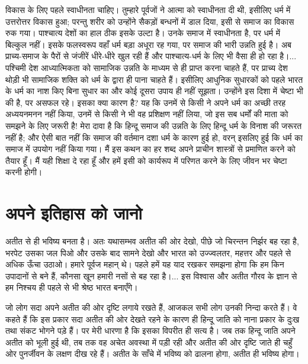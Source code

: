 विकास के लिए पहले स्वाधीनता चाहिए। तुम्हारे पूर्वजों ने आत्मा को स्वाधीनता दी थी, इसीलिए धर्म में उत्तरोत्तर विकास हुआ; परन्तु शरीर को उन्होंने सैकड़ों बन्धनों में डाल दिया, इसी से समाज का विकास रुक गया। पाश्चात्य देशों का हाल ठीक इसके उल्टा है। उनके समाज में स्वाधीनता है, पर धर्म में बिल्कुल नहीं। इसके फलस्वरूप वहाँ धर्म बड़ा अधूरा रह गया, पर समाज की भारी उन्नति हुई है। अब प्राच्य-समाज के पैरों से जंजीरें धीरे-धीरे खुल रही हैं और पाश्चात्य-धर्म के लिए भी वैसा ही हो रहा है।... पश्चिमी देश आध्यात्मिकता को सामाजिक उन्नति के माध्यम से ही प्राप्त करना चाहते हैं, पर प्राच्य देश थोड़ी भी सामाजिक शक्ति को धर्म के द्वारा ही पाना चाहते हैं। इसीलिए आधुनिक सुधारकों को पहले भारत के धर्म का नाश किए बिना सुधार का और कोई दूसरा उपाय ही नहीं सूझता। उन्होंने इस दिशा में चेष्टा भी की है, पर असफल रहे। इसका क्या कारण है? यह कि उनमें से किसी ने अपने धर्म का अच्छी तरह अध्ययनमनन नहीं किया, उनमें से किसी ने भी वह प्रशिक्षण नहीं लिया, जो इस सब धर्मों की माता को समझने के लिए जरूरी है! मेरा दावा है कि हिन्दू समाज की उन्नति के लिए हिन्दू धर्म के विनाश की जरूरत नहीं है; और ऐसी बात नहीं कि समाज की वर्तमान दशा धर्म के कारण हुई हो, वरन् इसलिए हुई कि धर्म का समाज में उपयोग नहीं किया गया। मैं इस कथन का हर शब्द अपने प्राचीन शास्त्रों से प्रमाणित करने को तैयार हूँ। मैं यही शिक्षा दे रहा हूँ और हमें इसी को कार्यरूप में परिणत करने के लिए जीवन भर चेष्टा करनी होगी।


\section*{अपने इतिहास को जानो}

\vskip -3pt

अतीत से ही भविष्य बनता है। अतः यथासम्भव अतीत की ओर देखो, पीछे जो चिरन्तन निर्झर बह रहा है, भरपेट उसका जल पिओ और उसके बाद सामने देखो और भारत को उज्ज्वलतर, महत्तर और पहले से अधिक ऊँचा उठाओ। हमारे पूर्वज महान् थे। पहले हमें यह याद रखकर समझना होगा कि हम किन उपादानों से बने हैं, कौनसा खून हमारी नसों से बह रहा है।... इस विश्वास और अतीत गौरव के ज्ञान से हम निश्चय ही पहले से भी श्रेष्ठ भारत बनाएँगे। 

जो लोग सदा अपने अतीत की ओर दृष्टि लगाये रखते हैं, आजकल सभी लोग उनकी निन्दा करते हैं। वे कहते हैं कि इस प्रकार सदा अतीत की ओर देखते रहने के कारण ही हिन्दू जाति को नाना प्रकार के दुःख तथा संकट भोगने पड़े हैं। पर मेरी धारणा है कि इसका विपरीत ही सत्य है। जब तक हिन्दू जाति अपने अतीत को भूली हुई थी, तब तक वह अचेत अवस्था में पड़ी रही और अतीत की ओर दृष्टि जाते ही चहुँ ओर पुनर्जीवन के लक्षण दीख रहे हैं। अतीत के साँचे में भविष्य को ढालना होगा, अतीत ही भविष्य होगा। 

